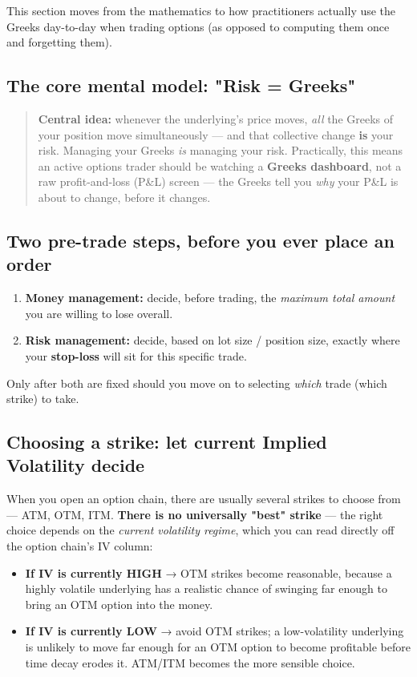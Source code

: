\documentclass[12pt,openany]{book}
\theoremstyle{definition}
\theoremstyle{remark}
\begin{document}
This section moves from the mathematics to how practitioners actually use the Greeks day-to-day when trading options (as opposed to computing them once and forgetting them).

\subsection{The core mental model: "Risk = Greeks"}

\begin{quote}
\textbf{Central idea:} whenever the underlying's price moves, \emph{all} the Greeks of your position move simultaneously — and that collective change \textbf{is} your risk. Managing your Greeks \emph{is} managing your risk. Practically, this means an active options trader should be watching a \textbf{Greeks dashboard}, not a raw profit-and-loss (P\&L) screen — the Greeks tell you \emph{why} your P\&L is about to change, before it changes.
\end{quote}

\subsection{Two pre-trade steps, before you ever place an order}

\begin{enumerate}
\item \textbf{Money management:} decide, before trading, the \emph{maximum total amount} you are willing to lose overall.
\item \textbf{Risk management:} decide, based on lot size / position size, exactly where your \textbf{stop-loss} will sit for this specific trade.
\end{enumerate}

Only after both are fixed should you move on to selecting \emph{which} trade (which strike) to take.

\subsection{Choosing a strike: let current Implied Volatility decide}

When you open an option chain, there are usually several strikes to choose from — ATM, OTM, ITM. \textbf{There is no universally "best" strike} — the right choice depends on the \emph{current volatility regime}, which you can read directly off the option chain's IV column:

\begin{itemize}
\item \textbf{If IV is currently HIGH} → OTM strikes become reasonable, because a highly volatile underlying has a realistic chance of swinging far enough to bring an OTM option into the money.
\item \textbf{If IV is currently LOW} → avoid OTM strikes; a low-volatility underlying is unlikely to move far enough for an OTM option to become profitable before time decay erodes it. ATM/ITM becomes the more sensible choice.
\end{itemize}
\end{document}

